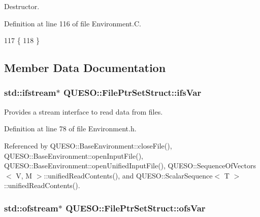 Destructor. 



Definition at line 116 of file Environment.\-C.


\begin{DoxyCode}
117 \{
118 \}
\end{DoxyCode}


\subsection{Member Data Documentation}
\hypertarget{struct_q_u_e_s_o_1_1_file_ptr_set_struct_a1faa6ed0771368358c29a492edf764ee}{
\subsubsection[{ifs\-Var}]{\setlength{\rightskip}{0pt plus 5cm}std\-::ifstream$\ast$ Q\-U\-E\-S\-O\-::\-File\-Ptr\-Set\-Struct\-::ifs\-Var}}\label{struct_q_u_e_s_o_1_1_file_ptr_set_struct_a1faa6ed0771368358c29a492edf764ee}


Provides a stream interface to read data from files. 



Definition at line 78 of file Environment.\-h.



Referenced by Q\-U\-E\-S\-O\-::\-Base\-Environment\-::close\-File(), Q\-U\-E\-S\-O\-::\-Base\-Environment\-::open\-Input\-File(), Q\-U\-E\-S\-O\-::\-Base\-Environment\-::open\-Unified\-Input\-File(), Q\-U\-E\-S\-O\-::\-Sequence\-Of\-Vectors$<$ V, M $>$\-::unified\-Read\-Contents(), and Q\-U\-E\-S\-O\-::\-Scalar\-Sequence$<$ T $>$\-::unified\-Read\-Contents().

\hypertarget{struct_q_u_e_s_o_1_1_file_ptr_set_struct_a354cb0a6659254aa38ba38986ccf5c8a}{
\subsubsection[{ofs\-Var}]{\setlength{\rightskip}{0pt plus 5cm}std\-::ofstream$\ast$ Q\-U\-E\-S\-O\-::\-File\-Ptr\-Set\-Struct\-::ofs\-Var}}\label{struct_q_u_e_s_o_1_1_file_ptr_set_struct_a354cb0a6659254aa38ba38986ccf5c8a}


